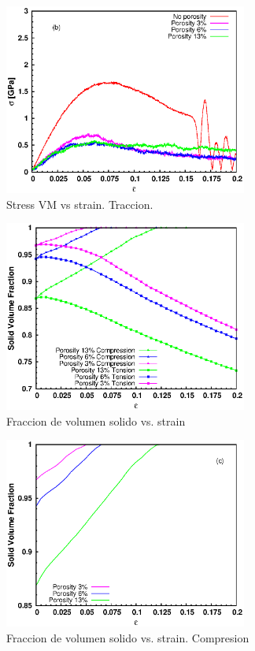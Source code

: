 \documentclass[10pt, oneside]{article} %
\begin{document}
\begin{figure}[H]
\centering
\includegraphics[width=8cm]{Figures/Porosidad/porosity_stress_strain_tens.eps}
\caption{Stress VM vs strain. Traccion.}
\end{figure}


\begin{figure}[H]
\centering
\includegraphics[width=8cm]{Figures/Porosidad/porosity_SVF_strain.eps}
\caption{Fraccion de volumen solido vs. strain}
\end{figure}

\begin{figure}[H]
\centering
\includegraphics[width=8cm]{Figures/Porosidad/porosity_SVF_strain_comp.eps}
\caption{Fraccion de volumen solido vs. strain. Compresion}
\end{figure}
\end{document}

